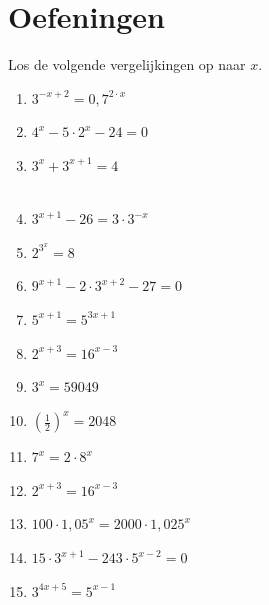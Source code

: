%
%

%
%
\section{Oefeningen}
\begin{oef}     
       Los de volgende vergelijkingen op naar $x$. 
\\
\begin{multicols}{2}
\begin{enumerate}
\item   $3^{-x+2}=0,7^{2\cdot x}$\\
\item   $4^{x}-5\cdot 2^{x}-24=0$ \\
\item    $3^{x}+3^{x+1}=4$ \\
\\ \item     $3^{x+1}-26=3\cdot 3^{-x}$  
\\ \item $2^{3^x}=8$ \
\\ \item $9^{x+1}-2\cdot 3^{x+2}-27=0$
\\ \item  $5^{x+1}=5^{3x+1}$
\\ \item $2^{x+3}=16^{x-3}$
\\ \item $3^x=59049$ 
\\ \item  $\left(\frac12\right)^x=2048$ 
\\ \item  $7^x=2\cdot 8^x$ 
\\ \item  $2^{x+3}=16^{x-3}$ 
\\ \item $100 \cdot 1,05^x=2000\cdot 1,025^x$
\\ \item $15\cdot 3^{x+1}-243\cdot 5^{x-2}=0$
\\ \item $3^{4x+5}=5^{x-1}$
\\ \end{enumerate}
\end{multicols}
\end{oef}


